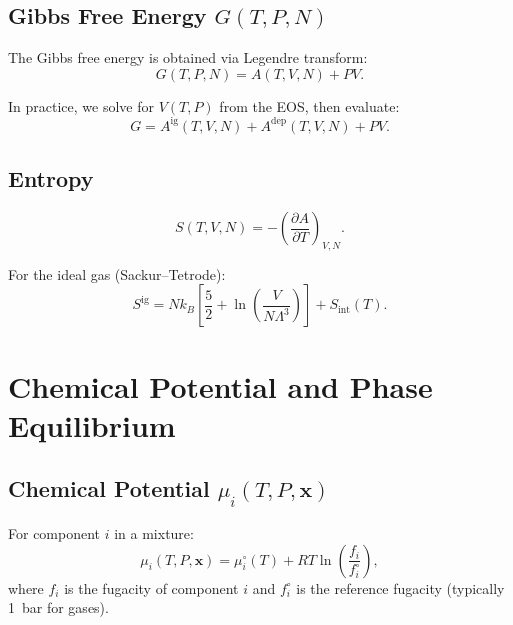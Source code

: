 \documentclass[11pt]{article}
\begin{document}
\subsection{Gibbs Free Energy $G(T,P,N)$}

The Gibbs free energy is obtained via Legendre transform:
\begin{equation}
  G(T,P,N) = A(T,V,N) + PV.
  \label{eq:gibbs}
\end{equation}

In practice, we solve for $V(T,P)$ from the EOS, then evaluate:
\begin{equation}
  G = A^\mathrm{ig}(T,V,N) + A^\mathrm{dep}(T,V,N) + PV.
  \label{eq:gibbs_eval}
\end{equation}

\subsection{Entropy}

\begin{equation}
  S(T,V,N) = -\left(\frac{\partial A}{\partial T}\right)_{V,N}.
  \label{eq:entropy}
\end{equation}

For the ideal gas (Sackur--Tetrode):
\begin{equation}
  S^\mathrm{ig} = Nk_B\left[\frac{5}{2}
    + \ln\!\left(\frac{V}{N\Lambda^3}\right)\right]
    + S_\mathrm{int}(T).
  \label{eq:sackur_tetrode}
\end{equation}


\section{Chemical Potential and Phase Equilibrium}

\subsection{Chemical Potential $\mu_i(T,P,\mathbf{x})$}

For component $i$ in a mixture:
\begin{equation}
  \mu_i(T,P,\mathbf{x}) = \mu_i^\circ(T)
    + RT\ln\!\left(\frac{f_i}{f_i^\circ}\right),
  \label{eq:chemical_potential}
\end{equation}
where $f_i$ is the fugacity of component $i$ and $f_i^\circ$ is the
reference fugacity (typically 1~bar for gases).
\end{document}
